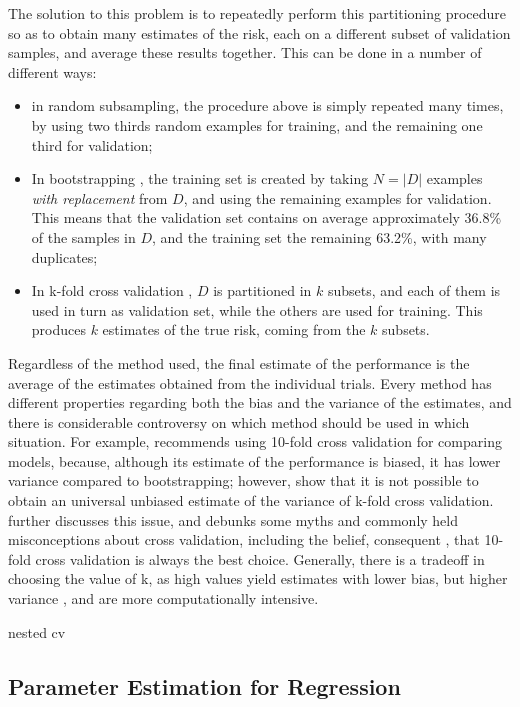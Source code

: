 \documentclass[12pt]{book}
\begin{document}
The solution to this problem is to repeatedly perform this partitioning procedure so as to obtain many estimates of the risk, each on a different subset of validation samples, and average these results together. This can be done in a number of different ways:

\begin{itemize}
\item in random subsampling, the procedure above is simply repeated many times, by using two thirds random examples for training, and the remaining one third for validation;
\item In bootstrapping \citep{bootstrap}, the training set is created by taking $N=\vert D\vert$ examples \emph{with replacement} from $D$, and using the remaining examples for validation. This means that the validation set contains on average approximately 36.8\% of the samples in $D$, and the training set the remaining 63.2\%, with many duplicates;
\item In k-fold cross validation \citep{kfold}, $D$ is partitioned in $k$ subsets, and each of them is used in turn as validation set, while the others are used for training. This produces $k$ estimates of the true risk, coming from the $k$ subsets.
\end{itemize}

Regardless of the method used, the final estimate of the performance is the average of the estimates obtained from the individual trials. Every method has different properties regarding both the bias and the variance of the estimates, and there is considerable controversy on which method should be used in which situation. For example, \cite{cv_bootstrap} recommends using 10-fold cross validation for comparing models, because, although its estimate of the performance is biased, it has lower variance compared to bootstrapping; however, \cite{no_unbiased_cv} show that it is not possible to obtain an universal unbiased estimate of the variance of k-fold cross validation. \cite{cvmyths} further discusses this issue, and debunks some myths and commonly held misconceptions about cross validation, including the belief, consequent \cite{cv_bootstrap}, that 10-fold cross validation is always the best choice. Generally, there is a tradeoff in choosing the value of k, as high values yield estimates with lower bias, but higher variance \citep{cv_survey}, and are more computationally intensive.

nested cv \cite{nested_cv}

\subsection{Parameter Estimation for Regression}
\label{sec:regression_fit}
\end{document}
